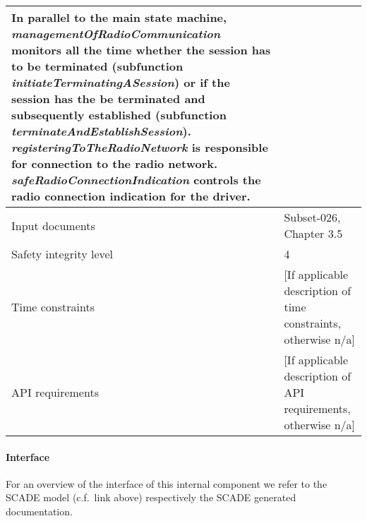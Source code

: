 \begin{longtable}{p{}p{}}
In parallel to the main state machine, \emph{managementOfRadioCommunication} monitors all the time whether the session has to be terminated (subfunction \emph{initiateTerminatingASession}) or if the session has the be terminated and subsequently established (subfunction \emph{terminateAndEstablishSession}). \emph{registeringToTheRadioNetwork} is responsible for connection to the radio network. \emph{safeRadioConnectionIndication} controls the radio connection indication for the driver.\\
\midrule
Input documents	& 
Subset-026, Chapter 3.5 \\
\midrule
Safety integrity level		& 4 \\
\midrule
Time constraints		& [If applicable description of time constraints, otherwise n/a] \\
\midrule
API requirements 		& [If applicable description of API requirements, otherwise n/a] \\
\bottomrule
\end{longtable}


\paragraph{Interface}

For an overview of the interface of this internal component we refer to the SCADE model (c.f.~link above) respectively the SCADE generated documentation.